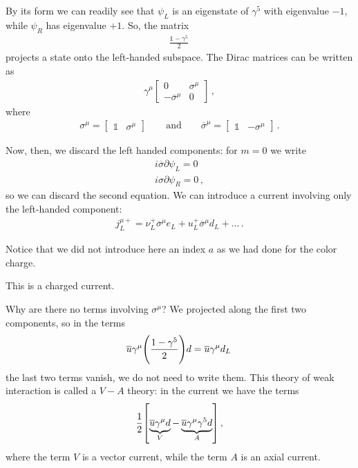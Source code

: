 \documentclass[main.tex]{subfiles}
\begin{document}
By its form we can readily see that \(\psi_{L}\) is an eigenstate of \(\gamma^{5}\) with eigenvalue \(-1\), while \(\psi_{R}\) has eigenvalue \(+1\). 
So, the matrix 
%
\begin{align}
\frac{\mathbb{1} - \gamma^{5}}{2} 
\,
\end{align}
%
projects a state onto the left-handed subspace.
The Dirac matrices can be written as 
%
\begin{subequations}
\begin{align}
\gamma^{\mu } \left[\begin{array}{cc}
0 & \sigma^{\mu }  \\ 
-\overline{\sigma}^{\mu } & 0
\end{array}\right]
\,,
\end{align}
\end{subequations}
%
where 
%
\begin{align}
\sigma^{\mu } = \left[\begin{array}{cc}
\mathbb{1} & \sigma^{\mu }
\end{array}\right]
\qquad \text{and} \qquad
\overline{\sigma}^{\mu } = \left[\begin{array}{cc}
\mathbb{1} & - \sigma^{\mu }
\end{array}\right]
\,.
\end{align}
%

Now, then, we discard the left handed components: for \(m=0\) we write 
%
\begin{subequations}
\begin{align}
i \overline{\sigma} \partial \psi_{L} =0\\
i \sigma \partial \psi_{R}=0
\,,
\end{align}
\end{subequations}
%
so we can discard the second equation. 
We can introduce a current involving only the left-handed component: 
%
\begin{align}
j^{\mu +}_{L} = \nu ^+_{L} \overline{\sigma}^{\mu } e_{L} + u ^+_{L} \overline{\sigma}^{\mu } d_{L} + \dots
\,.
\end{align}

Notice that we did not introduce here an index \(a\) as we had done for the color charge. 

This is a charged current.

Why are there no terms involving \(\sigma^{\mu }\)? We projected along the first two components, so in the terms 
%
\begin{align}
\overline{u} \gamma^{\mu } \qty( \frac{1-\gamma^{5}}{2})d = \overline{u} \gamma^{\mu } d_L
\,
\end{align}
%
the last two terms vanish, we do not need to write them.
This theory of weak interaction is called a \(V-A\) theory: in the current we have the terms 
%
\begin{align}
\frac{1}{2} \qty[ \underbrace{\overline{u} \gamma^{\mu } d}_{V} - \underbrace{\overline{u} \gamma^{\mu } \gamma^{5} d}_{A}]
\,,
\end{align}
%
where the term \(V\) is a vector current, while the term \(A\) is an axial current. 
\end{document}
